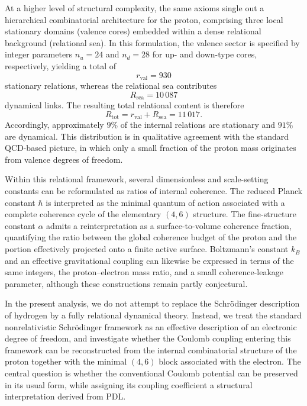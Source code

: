 \documentclass[12pt,a4paper]{article}
\begin{document}
At a higher level of structural complexity, the same axioms single out a hierarchical combinatorial architecture for the proton, comprising three local stationary domains (valence cores) embedded within a dense relational background (relational sea). In this formulation, the valence sector is specified by integer parameters \(n_u = 24\) and \(n_d = 28\) for up- and down-type cores, respectively, yielding a total of
\[
  r_{\text{val}} = 930
\]
stationary relations, whereas the relational sea contributes
\[
  R_{\text{sea}} = 10\,087
\]
dynamical links. The resulting total relational content is therefore
\[
  R_{\text{tot}} = r_{\text{val}} + R_{\text{sea}} = 11\,017.
\]
Accordingly, approximately \(9\%\) of the internal relations are stationary and \(91\%\) are dynamical. This distribution is in qualitative agreement with the standard QCD-based picture, in which only a small fraction of the proton mass originates from valence degrees of freedom.\cite{Laubscher2026PDL_English,Laubscher2026LDP_French}

Within this relational framework, several dimensionless and scale-setting constants can be reformulated as ratios of internal coherence. The reduced Planck constant \(\hbar\) is interpreted as the minimal quantum of action associated with a complete coherence cycle of the elementary \((4,6)\) structure. The fine-structure constant \(\alpha\) admits a reinterpretation as a surface-to-volume coherence fraction, quantifying the ratio between the global coherence budget of the proton and the portion effectively projected onto a finite active surface. Boltzmann’s constant \(k_B\) and an effective gravitational coupling can likewise be expressed in terms of the same integers, the proton–electron mass ratio, and a small coherence-leakage parameter, although these constructions remain partly conjectural.\cite{Laubscher2026PDL_English,Laubscher2026LDP_French}

In the present analysis, we do not attempt to replace the Schr\"odinger description of hydrogen by a fully relational dynamical theory. Instead, we treat the standard nonrelativistic Schr\"odinger framework as an effective description of an electronic degree of freedom, and investigate whether the Coulomb coupling entering this framework can be reconstructed from the internal combinatorial structure of the proton together with the minimal \((4,6)\) block associated with the electron. The central question is whether the conventional Coulomb potential can be preserved in its usual form, while assigning its coupling coefficient a structural interpretation derived from PDL.
\end{document}
